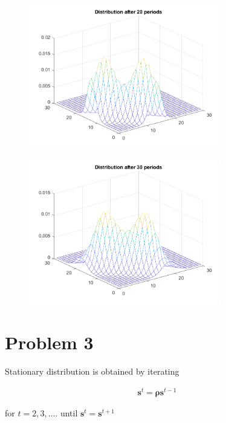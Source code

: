 \documentclass[11pt,letter]{article}
\newcommand{\vect}[1]{\boldsymbol{\mathbf{#1}}}
\newcounter{lem}[section] \setcounter{lem}{0}
\begin{document}
\begin{figure}[h]
\begin{center}
\includegraphics[width=0.75\textwidth]{20period.png}
\end{center}
\end{figure}


\begin{figure}[h]
\begin{center}
\includegraphics[width=0.75\textwidth]{30period.png}
\end{center}
\end{figure}

\newpage
\section*{Problem 3}

Stationary distribution is obtained by iterating

\begin{align*}
\vect{s}^t = \vect{\rho}\vect{s}^{t-1}
\end{align*}

 for $t=2,3,....$ until $\vect{s}^t = \vect{s}^{t+1}$
\end{document}
